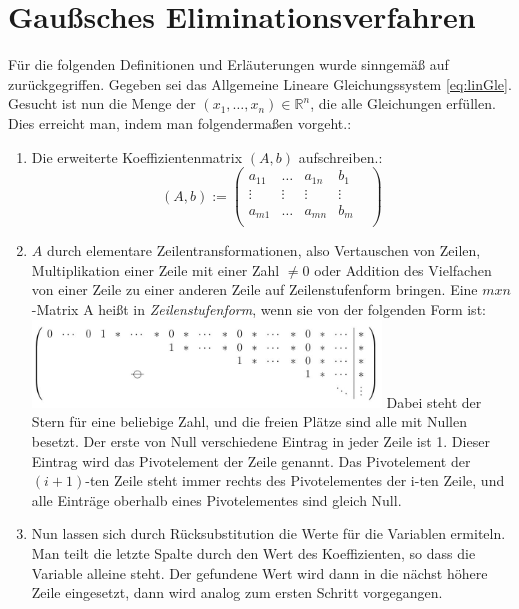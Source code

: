 \documentclass[a4paper, 12pt]{report}
\begin{document}
\begin{sloppypar}
\section{Gaußsches Eliminationsverfahren} \label{2.2}
Für die folgenden Definitionen und Erläuterungen wurde sinngemäß auf \cite{2} zurückgegriffen. \newline
Gegeben sei das Allgemeine Lineare Gleichungssystem \ref{eq:linGle}. Gesucht ist nun die Menge der $ (x_1, \hdots ,x_n ) \in \mathbb{R}^n $, die alle Gleichungen erfüllen.
Dies erreicht man, indem man folgendermaßen vorgeht.:
\begin{enumerate}
    \item Die erweiterte Koeffizientenmatrix $ (A, b) $ aufschreiben.:
        \begin{equation}
            (A, b):=
            \begin{pmatrix}
                a_{11} & \hdots &  a_{1n} &  b_1  \\
                \vdots & \vdots &  \vdots & \vdots &  \\
                a_{m1} &  \hdots &  a_{mn} &  b_m \\
            \end{pmatrix}
        \end{equation}
    \item $A$ durch elementare Zeilentransformationen, also Vertauschen von Zeilen, Multiplikation einer Zeile mit einer Zahl $\neq 0 $ oder Addition des Vielfachen von einer Zeile zu einer anderen Zeile auf Zeilenstufenform bringen.
        Eine $ m x n $-Matrix A heißt in \textit{Zeilenstufenform}, wenn sie von der folgenden Form ist: \newline \newline
        \includegraphics[width=350px]{"./Zeilenstufenform.jpeg"} \newline \newline
        Dabei steht der Stern für eine beliebige Zahl, und die freien Plätze sind alle mit Nullen besetzt. Der erste von Null verschiedene Eintrag in jeder Zeile ist 1. Dieser Eintrag wird das Pivotelement der Zeile genannt.
        Das Pivotelement der $(i + 1)$-ten Zeile steht immer rechts des Pivotelementes der i-ten Zeile, und alle Einträge oberhalb eines Pivotelementes sind gleich Null.
    \item Nun lassen sich durch Rücksubstitution die Werte für die Variablen ermiteln. Man teilt die letzte Spalte durch den Wert des Koeffizienten, so dass die Variable alleine steht.
          Der gefundene Wert wird dann in die nächst höhere Zeile eingesetzt, dann wird analog zum ersten Schritt vorgegangen.
\end{enumerate}


\end{sloppypar}
\end{document}
